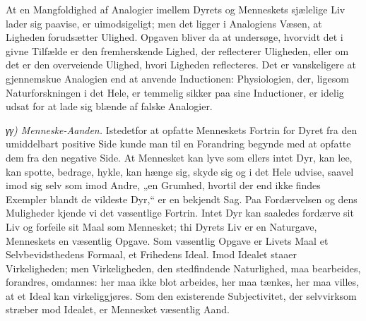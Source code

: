 \documentclass[12pt,a4paper]{book}
\begin{document}
At en Mangfoldighed af Analogier imellem Dyrets og Menneskets sjælelige Liv
lader sig paavise, er uimodsigeligt; men det ligger i Analogiens Væsen, at
Ligheden forudsætter Ulighed. Opgaven bliver da at undersøge, hvorvidt det i
givne Tilfælde er den fremherskende Lighed, der reflecterer Uligheden, eller om
det er den overveiende Ulighed, hvori Ligheden reflecteres. Det er vanskeligere
at gjennemskue Analogien end at anvende Inductionen: Physiologien, der, ligesom
Naturforskningen i det Hele, er temmelig sikker paa sine Inductioner, er idelig
udsat for at lade sig blænde af falske Analogier.

\emph{γγ) Menneske-Aanden.} Istedetfor at opfatte Menneskets Fortrin for Dyret
fra den umiddelbart positive Side kunde man til en Forandring begynde med at
opfatte dem fra den negative Side. At Mennesket kan lyve som ellers intet Dyr,
kan lee, kan spotte, bedrage, hykle, kan hænge sig, skyde sig og i det Hele
udvise, saavel imod sig selv som imod Andre, „en Grumhed, hvortil der end ikke
findes Exempler blandt de vildeste Dyr,“ er en bekjendt Sag. Paa Fordærvelsen og
dens Muligheder kjende vi det væsentlige Fortrin. Intet Dyr kan saaledes
fordærve sit Liv og forfeile sit Maal som Mennesket; thi Dyrets Liv er en
Naturgave, Menneskets en væsentlig Opgave. Som væsentlig Opgave er Livets Maal
et Selvbevidsthedens Formaal, et Frihedens Ideal. Imod Idealet staaer
Virkeligheden; men Virkeligheden, den stedfindende Naturlighed, maa bearbeides,
forandres, omdannes: her maa ikke blot arbeides, her maa tænkes, her maa villes,
at et Ideal kan virkeliggjøres. Som den existerende Subjectivitet, der
selvvirksom stræber mod Idealet, er Mennesket væsentlig Aand.
\end{document}
